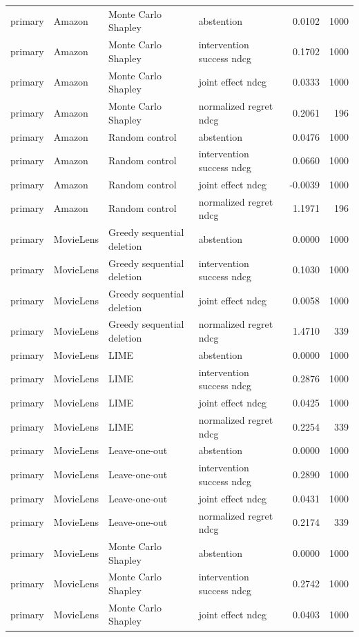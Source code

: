 \begin{longtable}{@{}p{}p{}p{}p{}rr@{}}
primary & Amazon & Monte Carlo Shapley & abstention & 0.0102 & 1000 \\
primary & Amazon & Monte Carlo Shapley & intervention success ndcg & 0.1702 & 1000 \\
primary & Amazon & Monte Carlo Shapley & joint effect ndcg & 0.0333 & 1000 \\
primary & Amazon & Monte Carlo Shapley & normalized regret ndcg & 0.2061 & 196 \\
primary & Amazon & Random control & abstention & 0.0476 & 1000 \\
primary & Amazon & Random control & intervention success ndcg & 0.0660 & 1000 \\
primary & Amazon & Random control & joint effect ndcg & -0.0039 & 1000 \\
primary & Amazon & Random control & normalized regret ndcg & 1.1971 & 196 \\
primary & MovieLens & Greedy sequential deletion & abstention & 0.0000 & 1000 \\
primary & MovieLens & Greedy sequential deletion & intervention success ndcg & 0.1030 & 1000 \\
primary & MovieLens & Greedy sequential deletion & joint effect ndcg & 0.0058 & 1000 \\
primary & MovieLens & Greedy sequential deletion & normalized regret ndcg & 1.4710 & 339 \\
primary & MovieLens & LIME & abstention & 0.0000 & 1000 \\
primary & MovieLens & LIME & intervention success ndcg & 0.2876 & 1000 \\
primary & MovieLens & LIME & joint effect ndcg & 0.0425 & 1000 \\
primary & MovieLens & LIME & normalized regret ndcg & 0.2254 & 339 \\
primary & MovieLens & Leave-one-out & abstention & 0.0000 & 1000 \\
primary & MovieLens & Leave-one-out & intervention success ndcg & 0.2890 & 1000 \\
primary & MovieLens & Leave-one-out & joint effect ndcg & 0.0431 & 1000 \\
primary & MovieLens & Leave-one-out & normalized regret ndcg & 0.2174 & 339 \\
primary & MovieLens & Monte Carlo Shapley & abstention & 0.0000 & 1000 \\
primary & MovieLens & Monte Carlo Shapley & intervention success ndcg & 0.2742 & 1000 \\
primary & MovieLens & Monte Carlo Shapley & joint effect ndcg & 0.0403 & 1000 \\

\end{longtable}
